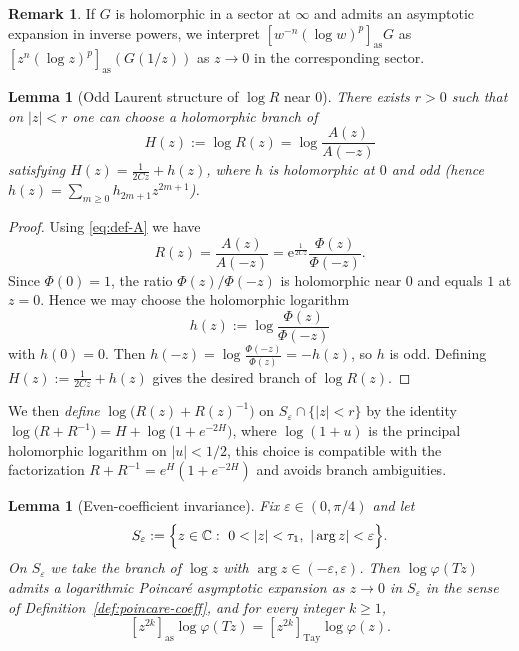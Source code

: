 \documentclass[11pt,letterpaper]{amsart}
\numberwithin{equation}{section}
\newtheorem{lemma}[theorem]{Lemma}
\theoremstyle{definition}
\newtheorem{remark}[theorem]{Remark}
\newcommand{\C}{\mathbb{C}}
\newcommand{\e}{\mathrm{e}}
\begin{document}
\begin{remark}\label{rem:as-infty}
If $G$ is holomorphic in a sector at $\infty$ and admits an asymptotic expansion in inverse powers,
we interpret $[w^{-n}(\log w)^p]_{\mathrm{as}}G$ as $[z^{n}(\log z)^p]_{\mathrm{as}}(G(1/z))$ as $z\to 0$
in the corresponding sector.
\end{remark}


\begin{lemma}[Odd Laurent structure of $\log R$ near $0$]\label{lem:logR-odd}
There exists $r>0$ such that on $|z|<r$ one can choose a holomorphic branch of
\[
H(z):=\log R(z)=\log\frac{A(z)}{A(-z)}
\]
satisfying $H(z)=\frac{1}{2Cz}+h(z)$, where $h$ is holomorphic at $0$ and odd
(hence $h(z)=\sum_{m\ge0} h_{2m+1}z^{2m+1}$).
\end{lemma}

\begin{proof}
Using \eqref{eq:def-A} we have
\[
R(z)=\frac{A(z)}{A(-z)}=\e^{\frac{1}{2Cz}}\frac{\Phi(z)}{\Phi(-z)}.
\]
Since $\Phi(0)=1$, the ratio $\Phi(z)/\Phi(-z)$ is holomorphic near $0$ and equals $1$ at $z=0$.
Hence we may choose the holomorphic logarithm
\[
h(z):=\log\frac{\Phi(z)}{\Phi(-z)}
\]
with $h(0)=0$. Then $h(-z)=\log\frac{\Phi(-z)}{\Phi(z)}=-h(z)$, so $h$ is odd.
Defining $H(z):=\frac{1}{2Cz}+h(z)$ gives the desired branch of $\log R(z)$.
\end{proof}

We then \emph{define} $\log\!\bigl(R(z)+R(z)^{-1}\bigr)$ on $S_\varepsilon\cap\{|z|<r\}$ by the identity $\log\!\bigl(R+R^{-1}\bigr)=H+\log\!\bigl(1+e^{-2H}\bigr)$, where $\log(1+u)$ is the principal holomorphic logarithm on $|u|<1/2$, this choice is compatible with the factorization $R+R^{-1}=e^{H}(1+e^{-2H})$ and avoids branch ambiguities.

\begin{lemma}[Even-coefficient invariance]\label{lem:even-coeff-invariance}
Fix $\varepsilon\in(0,\pi/4)$ and let
\[
S_\varepsilon:=\Bigl\{z\in\C:\ 0<|z|<\tau_1,\ |\arg z|<\varepsilon\Bigr\}.
\]
On $S_\varepsilon$ we take the branch of $\log z$ with $\arg z\in(-\varepsilon,\varepsilon)$.
Then $\log\varphi(Tz)$ admits a logarithmic Poincar\'e asymptotic expansion as $z\to0$ in $S_\varepsilon$
in the sense of Definition~\ref{def:poincare-coeff}, and for every integer $k\ge1$,
\begin{equation}\label{eq:even-coeff-invariance}
[z^{2k}]_{\mathrm{as}}\log\varphi(Tz)=[z^{2k}]_{\mathrm{Tay}}\log\varphi(z).
\end{equation}
\end{lemma}
\end{document}
